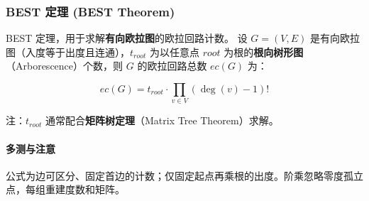 \subsubsection{BEST 定理 (BEST Theorem)}

BEST 定理，用于求解\textbf{有向欧拉图}的欧拉回路计数。
设 $G=(V, E)$ 是有向欧拉图（入度等于出度且连通），$t_{root}$ 为以任意点 $root$ 为根的\textbf{根向树形图}（Arborescence）个数，则 $G$ 的欧拉回路总数 $ec(G)$ 为：

$$
ec(G) = t_{root} \cdot \prod_{v \in V} (\deg(v) - 1)!
$$

\noindent 注：$t_{root}$ 通常配合\textbf{矩阵树定理}（Matrix Tree Theorem）求解。

\paragraph{多测与注意} 公式为边可区分、固定首边的计数；仅固定起点再乘根的出度。阶乘忽略零度孤立点，每组重建度数和矩阵。
